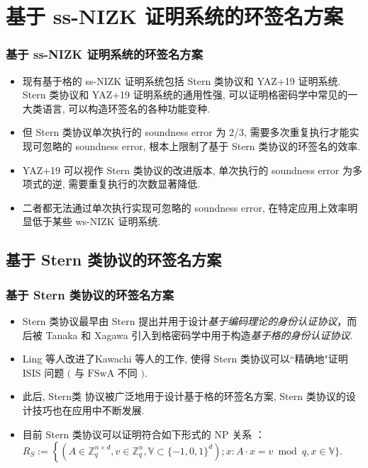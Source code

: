 \documentclass{beamer}
\begin{document}
\section{基于 ss-NIZK 证明系统的环签名方案}
\begin{frame}
    \frametitle{}

    \sectionpage

\end{frame}

\begin{frame}
    \frametitle{基于 ss-NIZK 证明系统的环签名方案}
    \begin{itemize}
        \item 现有基于格的 ss-NIZK 证明系统包括 Stern 类协议和 YAZ+19 证明系统. Stern 类协议和 YAZ+19 证明系统的通用性强, 可以证明格密码学中常见的一大类语言, 可以构造环签名的各种功能变种. 
        \item 但 Stern 类协议单次执行的 soundness error 为 2/3, 需要多次重复执行才能实现可忽略的 soundness error, 根本上限制了基于 Stern 类协议的环签名的效率. 
        \item YAZ+19 可以视作 Stern 类协议的改进版本, 单次执行的 soundness error 为多项式的逆, 需要重复执行的次数显著降低. 
        \item 二者都无法通过单次执行实现可忽略的 soundness error, 在特定应用上效率明显低于某些 ws-NIZK 证明系统.
    \end{itemize}
    

\end{frame}

\subsection{基于 Stern 类协议的环签名方案}
\begin{frame}
    \frametitle{基于 Stern 类协议的环签名方案}
    \begin{itemize}
        \item Stern 类协议最早由 Stern 提出并用于设计\emph{基于编码理论的身份认证协议}，而后被 Tanaka 和 Xagawa  引入到格密码学中用于构造\emph{基于格的身份认证协议}. 
        \item Ling 等人改进了Kawachi 等人的工作, 使得 Stern 类协议可以“精确地"证明 ISIS 问题 $($ 与 $\mathrm{FSwA}$ 不同 $) .$ 
        \item 此后, Stern类 协议被广泛地用于设计基于格的环签名方案, Stern 类协议的设计技巧也在应用中不断发展. 
        \item 目前 Stern 类协议可以证明符合如下形式的 $\mathrm{NP}$ 关系 ：$R_{S}:=\left\{\left(A \in \mathbb{Z}_{q}^{n \times d}, v \in \mathbb{Z}_{q}^{n}, \mathbb{V} \subset\{-1,0,1\}^{d}\right) ; x: A \cdot x=\right.v \bmod q, x \in \mathbb{V}\} .$ 
    \end{itemize}
    

\end{frame}
\end{document}
